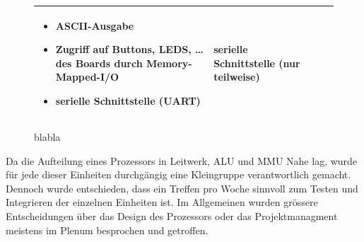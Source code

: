\begin{figure}[H]
\begin{tabular}{|p{50pt}|p{100pt}|p{180pt}|p{100pt}|}
\begin{itemize}[noitemsep,topsep=0pt]
                                         \item ASCII-Ausgabe
                                         \item Zugriff auf Buttons, LEDS, \dots{} des Boards durch Memory-Mapped-I/O
                                         \item serielle Schnittstelle (UART)
                                         \end{itemize}                                                                    & serielle Schnittstelle (nur teilweise)        \\
\hline
\end{tabular}
\caption{blabla}
\label{tab:projektablaufuebersicht}
\end{figure}

Da die Aufteilung eines Prozessors in Leitwerk, ALU und MMU Nahe lag, wurde
f\"ur jede dieser Einheiten durchg\"angig eine Kleingruppe verantwortlich
gemacht. Dennoch wurde entschieden, dass ein Treffen pro Woche sinnvoll zum
Testen und Integrieren der einzelnen Einheiten ist. Im Allgemeinen wurden
gr\"ossere Entscheidungen \"uber das Design des Prozessors oder das
Projektmanagment meistens im Plenum besprochen und getroffen.

